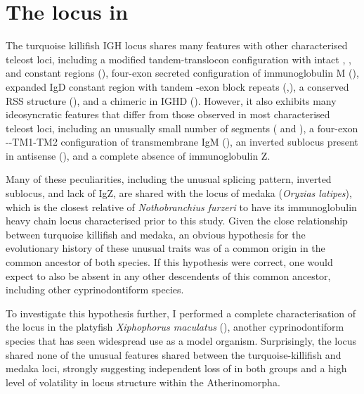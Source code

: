 \section{The \igh{} locus in \xma}
\label{sec:xma-locus}
	
	The turquoise killifish IGH locus shares many features with other characterised teleost loci, including a modified tandem-translocon configuration with intact \vh, \dh, \jh and constant regions (), four-exon secreted configuration of immunoglobulin M (), expanded IgD constant region with tandem \cd{}-exon block repeats (,), a conserved RSS structure (), and a chimeric  in IGHD (). However, it also exhibits many ideosyncratic features that differ from those observed in most characterised teleost loci, including an unusually small number of \vh segments ( and ), a four-exon --TM1-TM2 configuration of transmembrane IgM (), an inverted sublocus present in antisense (), and a complete absence of immunoglobulin Z.
	
	Many of these peculiarities, including the unusual  splicing pattern, inverted sublocus, and lack of IgZ, are shared with the \igh{} locus of medaka (\textit{Oryzias latipes}), which is the closest relative of \textit{Nothobranchius furzeri} to have its immunoglobulin heavy chain locus characterised prior to this study. Given the close relationship between turquoise killifish and medaka, an obvious hypothesis for the evolutionary history of these unusual traits was of a common origin in the common ancestor of both species. If this hypothesis were correct, one would expect  to also be absent in any other descendents of this common ancestor, including other cyprinodontiform species.

	To investigate this hypothesis further, I performed a complete characterisation of the \igh{} locus in the platyfish \textit{Xiphophorus maculatus} (), another cyprinodontiform species that has seen widespread use as a model organism. Surprisingly, the \Xma locus shared none of the unusual features shared between the turquoise-killifish and medaka loci, strongly suggesting independent loss of  in both groups and a high level of volatility in \igh{} locus structure within the Atherinomorpha.

